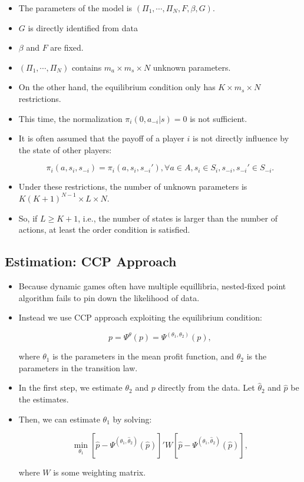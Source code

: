 \documentclass[]{book}
\providecommand{\tightlist}{%
  \setlength{\itemsep}{0pt}\setlength{\parskip}{0pt}}
\begin{document}
\begin{itemize}
\tightlist
\item
  The parameters of the model is
  \((\Pi_1, \cdots, \Pi_N, F, \beta, G)\).
\item
  \(G\) is directly identified from data
\item
  \(\beta\) and \(F\) are fixed.
\item
  \((\Pi_1, \cdots, \Pi_N)\) contains \(m_a \times m_s \times N\)
  unknown parameters.
\item
  On the other hand, the equilibrium condition only has
  \(K \times m_s \times N\) restrictions.
\item
  This time, the normalization \(\pi_i(0, a_{-i}|s) = 0\) is not
  sufficient.
\item
  It is often assumed that the payoff of a player \(i\) is not directly
  influence by the state of other players:

  \begin{equation}
  \pi_i(a, s_i, s_{-i}) = \pi_i(a, s_i, s_{-i}'), \forall a \in A, s_i \in S_i, s_{-i}, s_{-i}' \in S_{-i}.
  \end{equation}
\item
  Under these restrictions, the number of unknown parameters is
  \(K (K + 1)^{N - 1} \times L \times N\).
\item
  So, if \(L \ge K + 1\), i.e., the number of states is larger than the
  number of actions, at least the order condition is satisfied.
\end{itemize}

\subsection{Estimation: CCP Approach}\label{estimation-ccp-approach}

\begin{itemize}
\tightlist
\item
  Because dynamic games often have multiple equillibria, nested-fixed
  point algorithm fails to pin down the likelihood of data.
\item
  Instead we use CCP approach exploiting the equilibrium condition:

  \begin{equation}
  p = \Psi^\theta(p) = \Psi^{(\theta_1, \theta_2)}(p),
  \end{equation}

  where \(\theta_1\) is the parameters in the mean profit function, and
  \(\theta_2\) is the parameters in the transition law.
\item
  In the first step, we estimate \(\theta_2\) and \(p\) directly from
  the data. Let \(\hat{\theta}_2\) and \(\hat{p}\) be the estimates.
\item
  Then, we can estimate \(\theta_1\) by solving:

  \begin{equation}
  \min_{\theta_1} [\hat{p} - \Psi^{(\theta_1, \hat{\theta}_2)}(\hat{p})]' W [\hat{p} - \Psi^{(\theta_1, \hat{\theta}_2)}(\hat{p})],
  \end{equation}

  where \(W\) is some weighting matrix.
\end{itemize}
\end{document}
